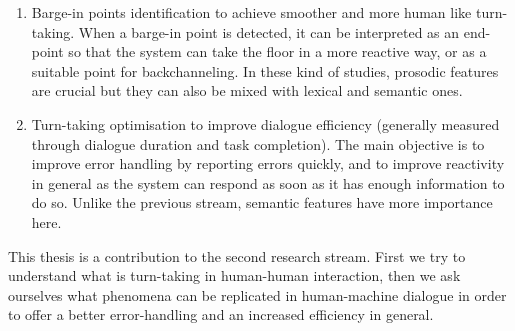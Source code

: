     \begin{enumerate}
    	\item Barge-in points identification to achieve smoother and more human like turn-taking. When a barge-in point is detected, it can be interpreted as an end-point so that the system can take the floor in a more reactive way, or as a suitable point for backchanneling. In these kind of studies, prosodic features are crucial but they can also be mixed with lexical and semantic ones.
        \item Turn-taking optimisation to improve dialogue efficiency (generally measured through dialogue duration and task completion). The main objective is to improve error handling by reporting errors quickly, and to improve reactivity in general as the system can respond as soon as it has enough information to do so. Unlike the previous stream, semantic features have more importance here.
    \end{enumerate}
    
    This thesis is a contribution to the second research stream. First we try to understand what is turn-taking in human-human interaction, then we ask ourselves what phenomena can be replicated in human-machine dialogue in order to offer a better error-handling and an increased efficiency in general.
    
    
    
    
    
    

